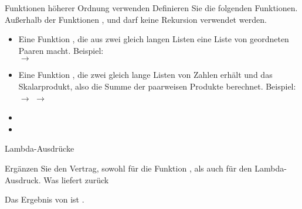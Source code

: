 \documentclass{../tuda-exercise}
\begin{document}
  \clearpagesolution

  \begin{task}[credit=\stars{1}{3}]{Funktionen höherer Ordnung verwenden}
    Definieren Sie die folgenden Funktionen. Außerhalb der Funktionen ,
     und  darf keine Rekursion verwendet werden.
    \begin{itemize}
      \item Eine Funktion , die aus zwei gleich langen Listen eine Liste von
      geordneten Paaren macht. Beispiel:
      \\
        \code{\textcolor{stringcolor}{"'a"' "'b"'})} 
      \(\rightarrow\)   \code{\textcolor{stringcolor}{"'a"'}}
       \code{\textcolor{stringcolor}{"'b"'}} 
      \item Eine Funktion , die zwei gleich lange Listen von Zahlen erhält
      und das Skalarprodukt, also die Summe der paarweisen Produkte berechnet. Beispiel:
      \\
       \(\rightarrow\)  \(\rightarrow\) 
    \end{itemize}

    \begin{solution}
      \begin{itemize}
        \item {}
        
        \item {}
        
      \end{itemize}
    \end{solution}
  \end{task}

  \clearpagesolution

  \begin{task}[credit=\stars{1}{3}]{Lambda-Ausdrücke}
    

    Ergänzen Sie den Vertrag, sowohl für die Funktion , als auch für den
    Lambda-Ausdruck. Was liefert  zurück

    \begin{solution}
      

      Das Ergebnis von  ist .
    \end{solution}
  \end{task}
\end{document}

